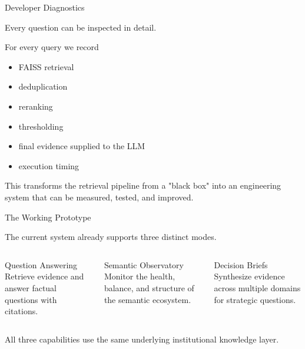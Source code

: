 \documentclass[aspectratio=169]{beamer}
\begin{document}
\begin{frame}{Developer Diagnostics}

Every question can be inspected in detail.

\vspace{0.4cm}

For every query we record

\begin{itemize}

\item FAISS retrieval

\item deduplication

\item reranking

\item thresholding

\item final evidence supplied to the LLM

\item execution timing

\end{itemize}

\vspace{0.5cm}

This transforms the retrieval pipeline from a "black box"
into an engineering system that can be measured, tested,
and improved.

\end{frame}

\begin{frame}{The Working Prototype}

The current system already supports three distinct modes.

\vspace{0.5cm}

\begin{columns}


\begin{block}{Question Answering}
Retrieve evidence and answer factual questions with citations.
\end{block}


\begin{block}{Semantic Observatory}
Monitor the health, balance, and structure of the semantic ecosystem.
\end{block}


\begin{block}{Decision Briefs}
Synthesize evidence across multiple domains for strategic questions.
\end{block}

\end{columns}

\vspace{0.7cm}

All three capabilities use the same underlying institutional knowledge layer.

\end{frame}
\end{document}

